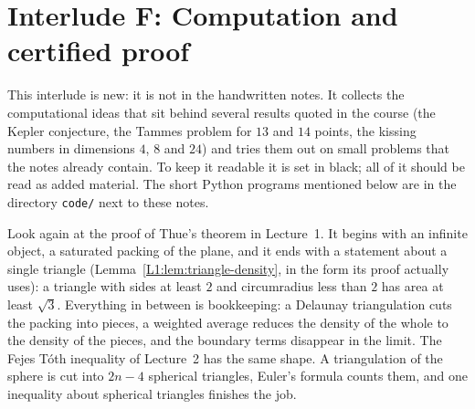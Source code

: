 
\chapter[Interlude F: Computation and proof]{Interlude F: Computation and certified proof}
\label{COMP:ch}

\begin{addedblock}
This interlude is new: it is not in the handwritten notes. It collects the computational ideas that
sit behind several results quoted in the course (the Kepler conjecture, the Tammes problem for $13$
and $14$ points, the kissing numbers in dimensions $4$, $8$ and $24$) and tries them out on small
problems that the notes already contain. To keep it readable it is set in black; all of it should be
read as added material. The short Python programs mentioned below are in the directory
\texttt{code/} next to these notes.
\end{addedblock}

Look again at the proof of Thue's theorem in Lecture~1. It begins with an infinite object, a
saturated packing of the plane, and it ends with a statement about a single triangle
(Lemma~\ref{L1:lem:triangle-density}, in the form its proof actually uses): a triangle with sides at
least $2$ and circumradius less than $2$ has area at least $\sqrt3$. Everything in between is bookkeeping: a Delaunay triangulation cuts the
packing into pieces, a weighted average reduces the density of the whole to the density of the pieces,
and the boundary terms disappear in the limit. The Fejes T\'oth inequality of Lecture~2 has the same
shape. A triangulation of the sphere is cut into $2n-4$ spherical triangles, Euler's formula counts
them, and one inequality about spherical triangles finishes the job.

